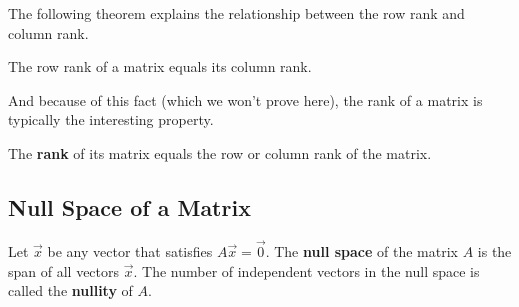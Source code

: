 The following theorem explains the relationship between the row rank and column rank. 

\begin{theorem}
The row rank of a matrix equals its column rank.  
\end{theorem}

And because of this fact (which we won't prove here), the rank of a matrix is typically the interesting property. 

\begin{definition}
The \textbf{rank} of its matrix equals the row or column rank of the matrix.  
\end{definition}

\subsection{Null Space of a Matrix} 

\begin{definition}
Let $\vec{x}$ be any vector that satisfies $A \vec{x}=\vec{0}$.  The \textbf{null space} of the matrix $A$ is the span of all vectors $\vec{x}$.  The number of independent vectors in the null space is called the \textbf{nullity} of $A$.  
\end{definition}

